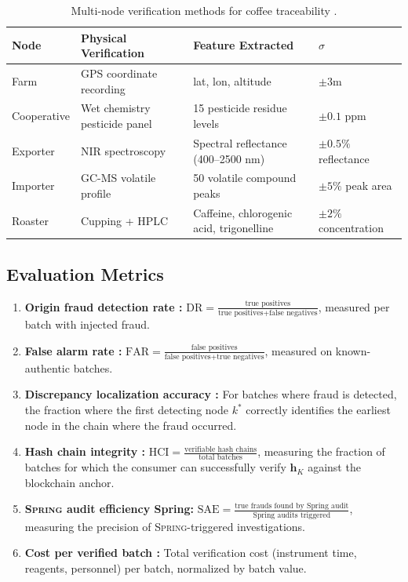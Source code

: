 \documentclass[11pt,a4paper]{article}
\theoremstyle{definition}
\theoremstyle{remark}
\newcommand{\Spring}{\textsc{Spring}}
\newcommand{\hashChain}{\mathbf{h}}
\begin{document}
\begin{table}[htbp]
\centering
\caption{Multi-node verification methods for coffee traceability .}
\label{tab:verification_methods}
\begin{tabular}{lp{3cm}p{3.5cm}p{3cm}}
\toprule
\textbf{Node } & \textbf{Physical Verification } & \textbf{Feature Extracted } & $\sigma$ \\
\midrule
Farm  & GPS coordinate recording & lat, lon, altitude & $\pm 3$m \\
Cooperative  & Wet chemistry pesticide panel & 15 pesticide residue levels & $\pm 0.1$ ppm \\
Exporter  & NIR spectroscopy & Spectral reflectance (400--2500 nm) & $\pm 0.5\%$ reflectance \\
Importer  & GC-MS volatile profile & 50 volatile compound peaks & $\pm 5\%$ peak area \\
Roaster  & Cupping + HPLC & Caffeine, chlorogenic acid, trigonelline & $\pm 2\%$ concentration \\
\bottomrule
\end{tabular}
\end{table}

\subsection{Evaluation Metrics}

\begin{enumerate}[label=(\arabic*)]
    \item \textbf{Origin fraud detection rate :} $\text{DR} = \frac{\text{true positives}}{\text{true positives} + \text{false negatives}}$, measured per batch with injected fraud.
    \item \textbf{False alarm rate :} $\text{FAR} = \frac{\text{false positives}}{\text{false positives} + \text{true negatives}}$, measured on known-authentic batches.
    \item \textbf{Discrepancy localization accuracy :} For batches where fraud is detected, the fraction where the first detecting node $k^*$ correctly identifies the earliest node in the chain where the fraud occurred.
    \item \textbf{Hash chain integrity :} $\text{HCI} = \frac{\text{verifiable hash chains}}{\text{total batches}}$, measuring the fraction of batches for which the consumer can successfully verify $\hashChain_K$ against the blockchain anchor.
    \item \textbf{\Spring{} audit efficiency Spring:} $\text{SAE} = \frac{\text{true frauds found by Spring audit}}{\text{Spring audits triggered}}$, measuring the precision of \Spring{}-triggered investigations.
    \item \textbf{Cost per verified batch :} Total verification cost (instrument time, reagents, personnel) per batch, normalized by batch value.
\end{enumerate}
\end{document}
